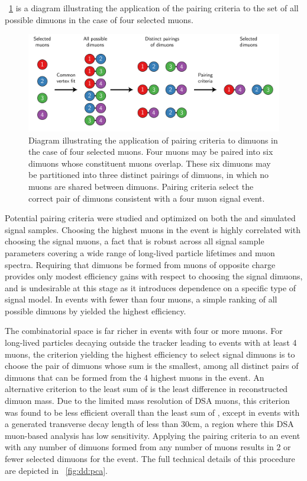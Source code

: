 \Fig~\ref{fig:dd:pc} is a diagram illustrating the application of the pairing criteria to the set of all possible dimuons in the case of four selected muons.
\begin{figure}[htpb]
  \centering
  \includegraphics[width=\textwidth]{figures/displaced/PairingCriteriaDiagram.pdf}
  \caption[Diagram illustrating the application of pairing criteria to dimuons in the case of four selected muons.]{Diagram illustrating the application of pairing criteria to dimuons in the case of four selected muons. Four muons may be paired into six dimuons whose constituent muons overlap. These six dimuons may be partitioned into three distinct pairings of dimuons, in which no muons are shared between dimuons. Pairing criteria select the correct pair of dimuons consistent with a four muon signal event.}
  \label{fig:dd:pc}
\end{figure}

Potential pairing criteria were studied and optimized on both the \twoMu and \fourMu simulated signal samples.
Choosing the highest \pT muons in the event is highly correlated with choosing the signal muons, a fact that is robust across all signal sample parameters covering a wide range of long-lived particle lifetimes and muon \pT spectra.
Requiring that dimuons be formed from muons of opposite charge provides only modest efficiency gains with respect to choosing the signal dimuons, and is undesirable at this stage as it introduces dependence on a specific type of signal model.
In events with fewer than four muons, a simple ranking of all possible dimuons by \vchisq yielded the highest efficiency.

The combinatorial space is far richer in events with four or more muons.
For long-lived particles decaying outside the tracker leading to events with at least 4 muons, the criterion yielding the highest efficiency to select signal dimuons is to choose the pair of dimuons whose \vchisq sum is the smallest, among all distinct pairs of dimuons that can be formed from the 4 highest \pT muons in the event. 
An alternative criterion to the least sum of \vchisq is the least difference in reconstructed dimuon mass.
Due to the limited mass resolution of DSA muons, this criterion was found to be less efficient overall than the least sum of \vchisq, except in events with a generated transverse decay length of less than 30\unit{cm}, a region where this DSA muon-based analysis has low sensitivity.
Applying the pairing criteria to an event with any number of dimuons formed from any number of muons results in 2 or fewer selected dimuons for the event.
The full technical details of this procedure are depicted in \Fig~\ref{fig:dd:pca}.

